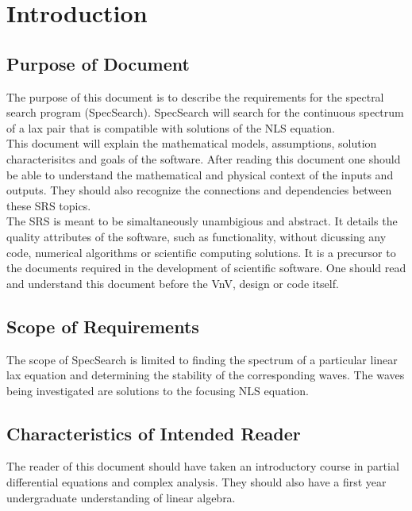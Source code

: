 \documentclass[12pt]{article}
\begin{document}
\newpage
\tableofcontents



\newpage 
\section{Introduction}

\subsection{Purpose of Document}
The purpose of this document is to describe the requirements for the spectral 
search program (SpecSearch). SpecSearch will search for the 
continuous spectrum of a lax pair that is compatible with solutions 
of the NLS 
equation. \\ 

This document will explain the mathematical models, assumptions, 
solution characterisitcs and goals of the software. After reading this document 
one should be able to understand the mathematical and physical context of the 
inputs and outputs. They should also recognize the connections and 
dependencies between these SRS topics. \\

The SRS is meant to be simaltaneously unambigious and abstract. It details the 
quality attributes of the software, such as functionality, 
without dicussing any code, numerical algorithms or scientific computing 
solutions. It is a precursor to the documents required in the development of 
scientific software. One should read and understand this document before the 
VnV, design or code itself. 

\subsection{Scope of Requirements} 

The scope of SpecSearch is limited to finding the spectrum of a particular 
linear lax equation and determining the stability of the corresponding waves. 
The waves being investigated are solutions to 
the focusing NLS equation. 

\subsection{Characteristics of Intended Reader} 

The reader of this document should have taken an introductory course 
in partial differential equations and complex analysis. They should also have a 
first year undergraduate understanding of linear algebra.
\end{document}

